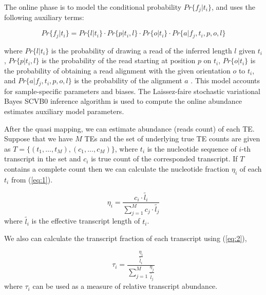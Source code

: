 \documentclass[wsdraft]{ws-procs11x85}
\begin{document}
The online phase is to model the conditional probability $Pr \{f_j | t_i \}$, and
uses the following auxiliary terms:

\begin{equation}
Pr \{f_j | t_i \} = Pr \{ l | t_i \} 
\cdot Pr \{ p | t_i, l \} 
\cdot Pr \{ o | t_i \} 
\cdot Pr \{ a | f_j, t_i, p, o, l \} 
\end{equation}

where $Pr \{ l | t_i \}$ 
is the probability of drawing a read of the inferred length $l$ given $t_i$,  
$Pr \{ p | t_i, l \}$ is the probability of the read starting at position $p$ on $t_i$,
$Pr \{ o | t_i \}$ is the probability of obtaining a read
alignment with the given orientation $o$ to $t_i$, and
$Pr \{ a | f_j, t_i, p, o, l \} $ is the probability of the alignment $a$ \cite{patro2017salmon}. 
This model accounts for sample-specific parameters and biases.
The Laissez-faire stochastic variational Bayes SCVB0 inference algorithm is used to 
compute the online abundance estimates auxiliary model parameters\cite{patro2017salmon}.

After the quasi mapping, 
we can estimate abundance (reads count) of each TE. 
% 
% 
% 
%
Suppose that
we have $M$ TEs and the set of underlying true TE counts are given as
$T = \{(t_1, \dots , t_M), (c_1, \dots, c_M) \}$, where $t_i$ is the nucleotide sequence of $i$-th transcript in the set and $c_i$ is true count of the corresponded transcript. 
If $T$ contains a complete count then we can calculate the nucleotide fraction $\eta_i$ of each $t_i$ from (\ref{eq:1}).\cite{li2009rna}
% 
% 
% 
%
 
\begin{equation} \label{eq:1}
\eta_i = \frac{c_i \cdot \widetilde{l_i} }{\sum_{j=1}^{M} c_j \cdot \widetilde{l_j}}
\end{equation}
where $\widetilde{l_i}$ is the effective transcript length of $t_i$\cite{li2009rna}.

We also can calculate the transcript fraction of each transcript using (\ref{eq:2}),

\begin{equation} \label{eq:2}
\tau_i = \frac{ \frac{\eta_i }{\widetilde{l_i}} }
{\sum_{j=1}^{M} \frac{\eta_j }{\widetilde{l_j}} }
\end{equation}
where $\tau_i$ can be used as a measure of relative transcript abundance.
% 
% 
% 
%
\end{document}
